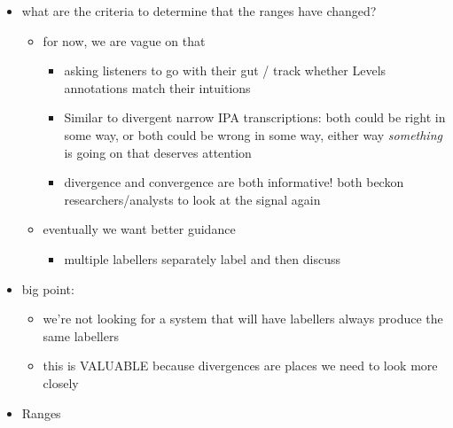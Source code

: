 \documentclass[11pt, twoside]{memoir}
\begin{document}
\begin{itemize}
\begin{itemize}
\begin{itemize}
      \begin{itemize}
      \tightlist
      \item
        one of the very useful functions of polar will allow for tests
        of unspoken/uninvestigated hunches:\\
      \end{itemize}
    \end{itemize}
  \item
    what are the criteria to determine that the ranges have changed?

    \begin{itemize}
    \tightlist
    \item
      for now, we are vague on that

      \begin{itemize}
      \tightlist
      \item
        asking listeners to go with their gut / track whether Levels
        annotations match their intuitions\\
      \item
        Similar to divergent narrow IPA transcriptions: both could be
        right in some way, or both could be wrong in some way, either
        way \emph{something} is going on that deserves attention\\
      \item
        divergence and convergence are both informative! both beckon
        researchers/analysts to look at the signal again\\
      \end{itemize}
    \item
      eventually we want better guidance

      \begin{itemize}
      \tightlist
      \item
        multiple labellers separately label and then discuss\\
      \end{itemize}
    \end{itemize}
  \item
    big point:

    \begin{itemize}
    \tightlist
    \item
      we're not looking for a system that will have labellers always
      produce the same labellers\\
    \item
      this is VALUABLE because divergences are places we need to look
      more closely\\
    \end{itemize}
  \item
    Ranges


\end{itemize}
\end{itemize}
\end{document}
